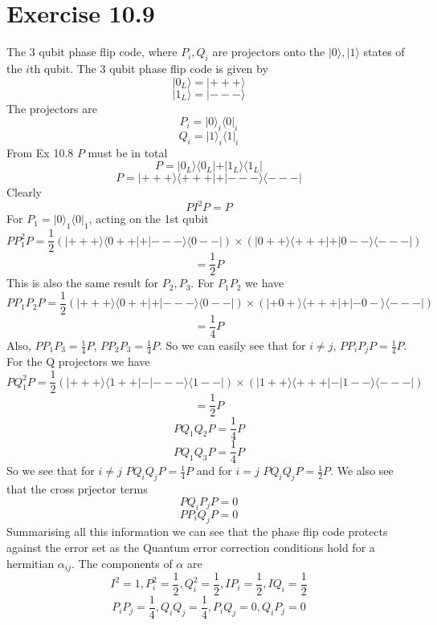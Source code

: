 \documentclass[12pt]{article}
\newcommand{\ket}[1]{\vert{#1}\rangle}
\newcommand{\bra}[1]{\langle{#1}\vert}
\begin{document}
\section{Exercise 10.9}
The 3 qubit phase flip code, where $P_i, Q_i$ are projectors onto the $\ket{0}, \ket{1}$ states of the $i$th qubit. The 3 qubit phase flip code is given by 
$$ \ket{0_L} = \ket{+++} $$
$$ \ket{1_L} = \ket{---} $$
The projectors are 
$$ P_i = \ket{0}_i \bra{0}_i $$
$$ Q_i = \ket{1}_i \bra{1}_i $$
From Ex 10.8 $P$ must be in total 
$$ P = \ket{0_L} \bra{0_L} + \ket{1_L} \bra{1_L} $$
$$ P = \ket{+++} \bra{+++} + \ket{---} \bra{---} $$
Clearly 
$$ P I^2 P = P $$
For $P_1 = \ket{0}_1 \bra{0}_1$, acting on the 1st qubit 
$$ P P_1^2 P = \frac{1}{2} ( \ket{+++}\bra{0++} + \ket{---}\bra{0--} ) \times (\ket{0++}\bra{+++} + \ket{0--} \bra{---} ) $$
$$ = \frac{1}{2} P $$
This is also the same result for $P_2, P_3$. For $P_1 P_2$ we have 
$$ P P_1 P_2 P = \frac{1}{2} ( \ket{+++}\bra{0++} + \ket{---} \bra{0--} ) \times ( \ket{+0+}\bra{+++} + \ket{-0-} \bra{---} ) $$
$$ = \frac{1}{4} P $$
Also, $P P_1 P_3 = \frac{1}{4} P$, $P P_2 P_3 = \frac{1}{4} P$. So we can easily see that for $i \neq j$, $P P_i P_j P = \frac{1}{4} P $. For the Q projectors we have 
$$ P Q_1^2 P = \frac{1}{2} ( \ket{+++} \bra{1++} - \ket{---} \bra{1--} ) \times ( \ket{1++} \bra{+++} - \ket{1--} \bra{---} ) $$
$$ = \frac{1}{2} P $$
$$ P Q_1 Q_2 P = \frac{1}{4} P $$
$$ P Q_1 Q_3 P = \frac{1}{4} P $$
So we see that for $i \neq j$ $P Q_i Q_j P = \frac{1}{4} P$ and for $i=j$ $P Q_i Q_j P = \frac{1}{2} P$. We also see that the cross prjector terms 
$$ P Q_i P_j P = 0 $$
$$ P P_i Q_j P = 0 $$
Summarising all this information we can see that the phase flip code protects against the error set as the Quantum error correction conditions hold for a hermitian $\alpha_{ij}$. The components of $\alpha$ are 
$$ I^2 = 1, P_i^2 = \frac{1}{2}, Q_i^2 = \frac{1}{2}, IP_i = \frac{1}{2}, IQ_i = \frac{1}{2} $$
$$ P_i P_j = \frac{1}{4}, Q_i Q_j = \frac{1}{4}, P_i Q_j = 0, Q_i P_j = 0 $$
\end{document}
